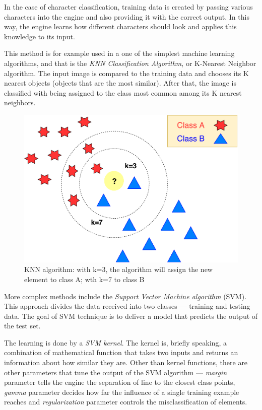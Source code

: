 In the case of character classification, training data is created by passing various characters into the engine and also providing it with the correct output. In this way, the engine learns how different characters should look and applies this knowledge to its input.

This method is for example used in a one of the simplest machine learning algorithms, and that is the \emph{KNN Classification Algorithm}, or K-Nearest Neighbor algorithm. The input image is compared to the training data and chooses its K nearest objects (objects that are the most similar). After that, the image is classified with being assigned to the class most common among its K nearest neighbors.

\begin{figure}[H]
\centering
\includegraphics[width=0.7\linewidth]{img/knn.pdf}
\caption{KNN algorithm: with k=3, the algorithm will assign the new element to class A; wth k=7 to class B } \label{fig:1a}
\end{figure}

More complex methods include the \emph{Support Vector Machine algorithm} (SVM). This approach divides the data received into two classes --- training and testing data. The goal of SVM technique is to deliver a model that predicts the output of the test set.

The learning is done by a \emph{SVM kernel}. The kernel is, briefly speaking, a combination of mathematical function that takes two inputs and returns an information about how similar they are. Other than kernel functions, there are other parameters that tune the output of the SVM algorithm --- \emph{margin} parameter tells the engine the separation of line to the closest class points, \emph{gamma} parameter decides how far the influence of a single training example reaches and \emph{regularization} parameter controls the misclassification of elements.

